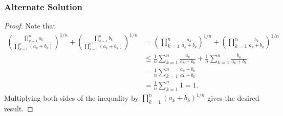 \documentclass[11pt]{scrartcl}
\newcommand{\<}{\langle}
\renewcommand{\>}{\rangle}
\begin{document}
\subsubsection{Alternate Solution}
\begin{proof}
Note that 
\begin{align*}
\left (\frac{\prod_{k=1}^n a_k}{\prod_{k=1}^{n} (a_k + b_k)} \right)^{1/n} + \left (\frac{\prod_{k=1}^n b_k}{\prod_{k=1}^{n} (a_k + b_k)} \right)^{1/n} &= \left (\prod_{k=1}^n \frac{a_k}{a_k + b_k} \right)^{1/n} + \left (\prod_{k=1}^n \frac{b_k}{a_k + b_k} \right)^{1/n}  \\
&\le \frac{1}{n} \sum_{k=1}^n \frac{a_k}{a_k+b_k} + \frac{1}{n} \sum_{k=1}^n \frac{b_k}{a_k + b_k} \\
&= \frac{1}{n} \sum_{k=1}^n \frac{a_k + b_k}{a_k + b_k} \\
&= \frac{1}{n} \sum_{k=1}^n 1 = 1.  
\end{align*}
Multiplying both sides of the inequality by $\prod_{k=1}^n (a_k+b_k)^{1/n}$ gives the desired result.  
\end{proof}

\pagebreak
\end{document}
